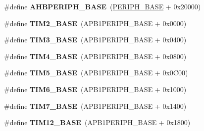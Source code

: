 \begin{DoxyCompactItemize}
\item 
\hypertarget{group___peripheral__memory__map_ga92eb5d49730765d2abd0f5b09548f9f5}{\#define {\bfseries A\-H\-B\-P\-E\-R\-I\-P\-H\-\_\-\-B\-A\-S\-E}~(\hyperlink{group___peripheral__memory__map_ga9171f49478fa86d932f89e78e73b88b0}{P\-E\-R\-I\-P\-H\-\_\-\-B\-A\-S\-E} + 0x20000)}\label{group___peripheral__memory__map_ga92eb5d49730765d2abd0f5b09548f9f5}

\item 
\hypertarget{group___peripheral__memory__map_ga00d0fe6ad532ab32f0f81cafca8d3aa5}{\#define {\bfseries T\-I\-M2\-\_\-\-B\-A\-S\-E}~(A\-P\-B1\-P\-E\-R\-I\-P\-H\-\_\-\-B\-A\-S\-E + 0x0000)}\label{group___peripheral__memory__map_ga00d0fe6ad532ab32f0f81cafca8d3aa5}

\item 
\hypertarget{group___peripheral__memory__map_gaf0c34a518f87e1e505cd2332e989564a}{\#define {\bfseries T\-I\-M3\-\_\-\-B\-A\-S\-E}~(A\-P\-B1\-P\-E\-R\-I\-P\-H\-\_\-\-B\-A\-S\-E + 0x0400)}\label{group___peripheral__memory__map_gaf0c34a518f87e1e505cd2332e989564a}

\item 
\hypertarget{group___peripheral__memory__map_ga56e2d44b0002f316527b8913866a370d}{\#define {\bfseries T\-I\-M4\-\_\-\-B\-A\-S\-E}~(A\-P\-B1\-P\-E\-R\-I\-P\-H\-\_\-\-B\-A\-S\-E + 0x0800)}\label{group___peripheral__memory__map_ga56e2d44b0002f316527b8913866a370d}

\item 
\hypertarget{group___peripheral__memory__map_ga3e1671477190d065ba7c944558336d7e}{\#define {\bfseries T\-I\-M5\-\_\-\-B\-A\-S\-E}~(A\-P\-B1\-P\-E\-R\-I\-P\-H\-\_\-\-B\-A\-S\-E + 0x0\-C00)}\label{group___peripheral__memory__map_ga3e1671477190d065ba7c944558336d7e}

\item 
\hypertarget{group___peripheral__memory__map_ga8268ec947929f192559f28c6bf7d1eac}{\#define {\bfseries T\-I\-M6\-\_\-\-B\-A\-S\-E}~(A\-P\-B1\-P\-E\-R\-I\-P\-H\-\_\-\-B\-A\-S\-E + 0x1000)}\label{group___peripheral__memory__map_ga8268ec947929f192559f28c6bf7d1eac}

\item 
\hypertarget{group___peripheral__memory__map_ga0ebf54364c6a2be6eb19ded6b18b6387}{\#define {\bfseries T\-I\-M7\-\_\-\-B\-A\-S\-E}~(A\-P\-B1\-P\-E\-R\-I\-P\-H\-\_\-\-B\-A\-S\-E + 0x1400)}\label{group___peripheral__memory__map_ga0ebf54364c6a2be6eb19ded6b18b6387}

\item 
\hypertarget{group___peripheral__memory__map_ga33dea32fadbaecea161c2ef7927992fd}{\#define {\bfseries T\-I\-M12\-\_\-\-B\-A\-S\-E}~(A\-P\-B1\-P\-E\-R\-I\-P\-H\-\_\-\-B\-A\-S\-E + 0x1800)}\label{group___peripheral__memory__map_ga33dea32fadbaecea161c2ef7927992fd}


\end{DoxyCompactItemize}
